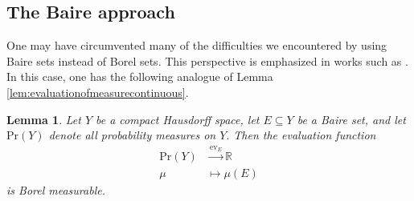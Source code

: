 \documentclass[12pt]{article}
\theoremstyle{theorem}
\newtheorem{lemma}[equation]{Lemma}
\theoremstyle{definition}
\numberwithin{equation}{section}
\newcommand{\be}{\begin{equation}}
\newcommand{\ee}{\end{equation}}
\newcommand{\blem}{\begin{lemma}}
\newcommand{\elem}{\end{lemma}}
\newcommand{\<}{\langle}
\renewcommand{\>}{\rangle}
\def\R{{{\mathbb R}}}
\begin{document}
\subsection{The Baire approach}
\label{sec:otherapproaches}
One may have circumvented many of the difficulties we encountered by using
Baire sets instead of Borel sets. This perspective is emphasized in works
such as \cite{EFHN15}.
In this case, one has the following analogue of 
Lemma \ref{lem:evaluationofmeasurecontinuous}.

\blem
\label{lem:IddosLemma}
Let $Y$ be a compact Hausdorff space,
let $E\subseteq Y$ be a Baire set, 
and let $\mathrm{Pr}(Y)$ denote all probability measures 
on $Y.$ Then the evaluation function 
\be
\begin{split}
\mathrm{Pr}(Y)&\xrightarrow{\mathrm{ev}_{E}}\R\\
\mu&\mapsto\mu(E)
\end{split}
\ee
is Borel measurable. 
\elem
\end{document}

